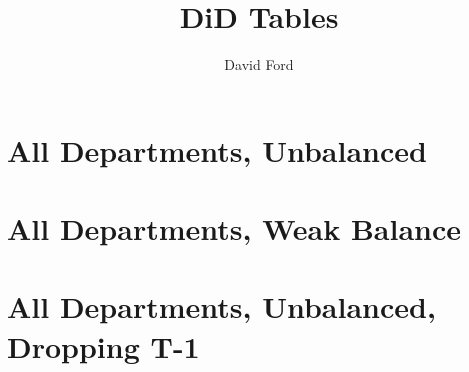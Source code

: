 \documentclass[12pt,a4paper]{article}
\begin{document}

\title{DiD Tables}
\author{David Ford}
\maketitle


\pagebreak

\section{All Departments, Unbalanced}

\begin{center}

\end{center}

\begin{center}

\end{center}

\pagebreak

\section{All Departments, Weak Balance}

\begin{center}

\end{center}

\begin{center}

\end{center}

\pagebreak

\section{All Departments, Unbalanced, Dropping T-1}

\begin{center}

\end{center}
\end{document}
